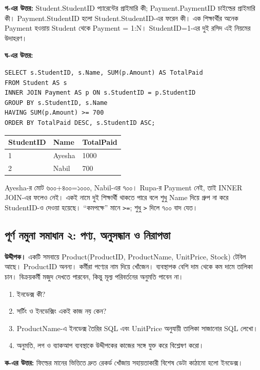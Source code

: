 \textbf{গ-এর উত্তর:} Student.StudentID প্যারেন্টের প্রাইমারি কী; Payment.PaymentID চাইল্ডের প্রাইমারি কী। Payment.StudentID হলো Student.StudentID-এর ফরেন কী। এক শিক্ষার্থীর অনেক Payment হওয়ায় Student থেকে Payment = 1:N। StudentID=1-এর দুই রসিদ এই নিয়মের উদাহরণ।
\begin{flushleft}
\small
{}
\end{flushleft}
\textbf{ঘ-এর উত্তর:}
\begin{verbatim}
SELECT s.StudentID, s.Name, SUM(p.Amount) AS TotalPaid
FROM Student AS s
INNER JOIN Payment AS p ON s.StudentID = p.StudentID
GROUP BY s.StudentID, s.Name
HAVING SUM(p.Amount) >= 700
ORDER BY TotalPaid DESC, s.StudentID ASC;
\end{verbatim}
\begin{flushleft}
\small
\begin{tabular}{|l|l|l|}\hline
StudentID & Name & TotalPaid\\ \hline
1 & Ayesha & 1000\\\hline
2 & Nabil & 700\\ \hline
\end{tabular}
\end{flushleft}
Ayesha-র মোট ৬০০+৪০০=১০০০, Nabil-এর ৭০০। Rupa-র Payment নেই, তাই INNER JOIN-এর ফলেও নেই। একই নামে দুই শিক্ষার্থী থাকতে পারে বলে শুধু Name দিয়ে গ্রুপ না করে StudentID-ও দেওয়া হয়েছে। “কমপক্ষে” মানে \texttt{>=}; শুধু \texttt{>} দিলে ৭০০ বাদ যেত।

\subsection{পূর্ণ নমুনা সমাধান ২: পণ্য, অনুসন্ধান ও নিরাপত্তা}
\textbf{উদ্দীপক।} একটি সমবায়ে Product(ProductID, ProductName, UnitPrice, Stock) টেবিল আছে। ProductID অনন্য। কর্মীরা পণ্যের নাম দিয়ে খোঁজেন। ব্যবস্থাপক বেশি দাম থেকে কম দামে তালিকা চান। বিক্রয়কর্মী মজুদ দেখতে পারবেন, কিন্তু মূল্য পরিবর্তনের অনুমতি পাবেন না।
\begin{enumerate}
\item[ক.] ইনডেক্স কী?
\item[খ.] সর্টিং ও ইনডেক্সিং একই কাজ নয় কেন?
\item[গ.] ProductName-এ ইনডেক্স তৈরির SQL এবং UnitPrice অনুযায়ী তালিকা সাজানোর SQL লেখো।
\item[ঘ.] অনুমতি, লগ ও ব্যাকআপ ব্যবস্থাকে উদ্দীপকের কাজের সঙ্গে যুক্ত করে বিশ্লেষণ করো।
\end{enumerate}
\textbf{ক-এর উত্তর:} ফিল্ডের মানের ভিত্তিতে দ্রুত রেকর্ড খোঁজায় সহায়তাকারী বিশেষ ডেটা কাঠামো হলো ইনডেক্স।

